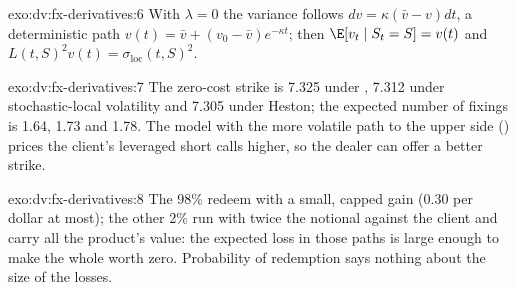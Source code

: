 \begin{solution}{exo:dv:fx-derivatives:6}
With $\lambda=0$ the variance follows $dv=\kappa(\bar v-v)dt$, a deterministic path $v(t)=\bar v+(v_0-\bar v)e^{-\kappa t}$; then
$\E[v_t\mid S_t=S]=v(t)$ and $L(t,S)^2v(t)=\sigma_{\mathrm{loc}}(t,S)^2$.
\end{solution}

\begin{solution}{exo:dv:fx-derivatives:7}
The zero-cost strike is 7.325 under , 7.312 under stochastic-local volatility and 7.305 under Heston; the expected number of fixings is 1.64,
1.73 and 1.78. The model with the more volatile path to the upper side () prices the client's leveraged short calls higher, so the dealer
can offer a better strike.
\end{solution}

\begin{solution}{exo:dv:fx-derivatives:8}
The 98\% redeem with a small, capped gain (0.30 per dollar at most); the other 2\% run with twice the notional against the client and carry all the product's
value: the expected loss in those paths is large enough to make the whole worth zero. Probability of redemption says nothing about the size of the losses.
\end{solution}

